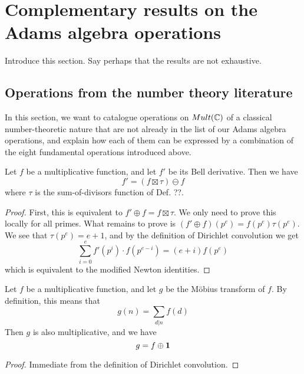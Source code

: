 
\section{Complementary results on the Adams algebra operations}  \label{sec:Complementary}

Introduce this section. Say perhaps that the results are not exhaustive.

\subsection{Operations from the number theory literature}

In this section, we want to catalogue operations on $Mult(\mathbb{C})$ of a classical number-theoretic nature that are not already in the list of our Adams algebra operations, and explain how each of them can be expressed by a combination of the eight fundamental operations introduced above. 

\begin{theorem}
Let $f$ be a multiplicative function, and let $f'$ be its Bell derivative. Then we have
$$   f' = (f \boxtimes \tau) \ominus  f  $$  
where $\tau$ is the sum-of-divisors function of Def. ??.
\end{theorem}

\begin{proof}
First, this is equivalent to $f' \oplus f = f \boxtimes \tau$. We only need to prove this locally for all primes. What remains to prove is $(f' \oplus f)(p^e) = f(p^e) \tau(p^e)$. We see that $\tau(p^e) = e + 1$, and by the definition of Dirichlet convolution we get 
$$\sum_{i = 0}^e f'(p^i) \cdot f(p^{e - i}) = (e + i)f(p^e)$$
which is equivalent to the modified \todo{} Newton identities.
\end{proof}



\begin{propdef}
Let $f$ be a multiplicative function, and let $g$ be the M{\"o}bius transform of $f$. By definition, this means that
$$  g(n) = \sum_{d \vert n} f(d)  $$
Then $g$ is also multiplicative, and we have
$$  g = f \oplus \mathbf{1}   $$
\end{propdef}
\begin{proof}
Immediate from the definition of Dirichlet convolution.
\end{proof}

